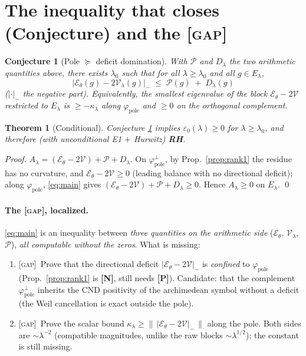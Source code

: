 \documentclass[11pt]{article}
\newcommand{\PR}{\textcolor{green!55!black}{\textbf{[P]}}}
\newcommand{\NM}{\textcolor{blue!70!black}{\textbf{[N]}}}
\newcommand{\GAP}{\textcolor{red!75!black}{\textsc{[gap]}}}
\theoremstyle{plain}
\newtheorem{theorem}{Theorem}
\newtheorem{conjecture}{Conjecture}
\theoremstyle{definition}
\newcommand{\El}{E_\lambda}
\newcommand{\kin}{\mathcal E_\theta}
\newcommand{\pole}{\mathcal P}
\newcommand{\vv}{\mathcal V}
\begin{document}
\section{The inequality that closes (Conjecture) and the \GAP}\label{sec:conj}

\begin{conjecture}[Pole $\succeq$ deficit domination]\label{conj:main}
With $\pole$ and $D_\lambda$ the two arithmetic quantities above, there exists
$\lambda_0$ such that for all $\lambda\ge\lambda_0$ and all $g\in\El$,
\begin{equation}\label{eq:main}
  \boxed{\;\bigl|\kin(g)-2\vv_\lambda(g)\bigr|_{-}\;\le\;\pole(g)\;+\;D_\lambda(g)\;}
\end{equation}
($|\cdot|_-$ the negative part). Equivalently, the smallest eigenvalue of the block
$\kin-2\vv$ restricted to $\El$ is $\ge-\kappa_\lambda$ along
$\varphi_{\mathrm{pole}}$ and $\ge0$ on the orthogonal complement.
\end{conjecture}

\begin{theorem}[Conditional]\label{thm:cond}
Conjecture \ref{conj:main} implies $\varepsilon_0(\lambda)\ge0$ for
$\lambda\ge\lambda_0$, and therefore (with unconditional E1 $+$ Hurwitz) \textbf{RH}.
\end{theorem}
\begin{proof}
$A_\lambda=(\kin-2\vv)+\pole+D_\lambda$. On $\varphi_{\mathrm{pole}}^\perp$, by
Prop.\ \ref{prop:rank1} the residue has no curvature, and $\kin-2\vv\ge0$ (leading
balance with no directional deficit); along $\varphi_{\mathrm{pole}}$, \eqref{eq:main}
gives $(\kin-2\vv)+\pole+D_\lambda\ge0$. Hence $A_\lambda\ge0$ on $\El$. \qed
\end{proof}

\paragraph{The \GAP, localized.}
\eqref{eq:main} is an inequality between \emph{three quantities on the arithmetic
side} ($\kin$, $\vv_\lambda$, $\pole$), \emph{all computable without the zeros}. What
is missing:
\begin{enumerate}[label=(\roman*),leftmargin=2em]
\item \GAP\ Prove that the directional deficit $|\kin-2\vv|_-$ is \emph{confined}
to $\varphi_{\mathrm{pole}}$ (Prop.\ \ref{prop:rank1} is \NM, still needs \PR).
Candidate: that the complement $\varphi_{\mathrm{pole}}^\perp$ inherits the CND
positivity of the archimedean symbol without a deficit (the Weil cancellation is
exact outside the pole).
\item \GAP\ Prove the scalar bound $\kappa_\lambda\ge\|\,|\kin-2\vv|_-\,\|$ along
the pole. Both sides are $\sim\lambda^{-2}$ (compatible magnitudes, unlike the
raw blocks $\sim\lambda^{1/2}$); the constant is still missing.
\end{enumerate}
\end{document}
